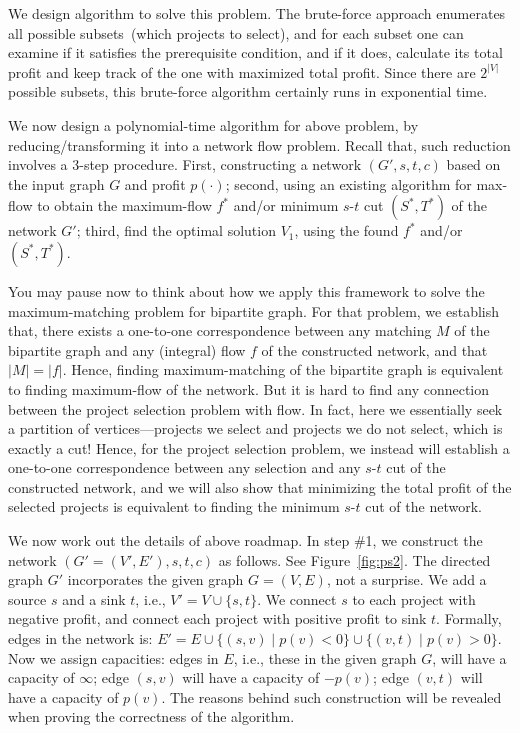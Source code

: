We design algorithm to solve this problem. The brute-force approach
enumerates all possible subsets~(which projects to select), and for each subset
one can examine if it satisfies the prerequisite condition, and if it does, calculate
its total profit and keep track of the one with maximized total profit. 
Since there are $2^{|V|}$ possible subsets, this brute-force algorithm certainly runs in exponential time.

We now design a polynomial-time algorithm for above problem, by
reducing/transforming it into a network flow problem.
Recall that, such reduction involves a 3-step procedure. First,
constructing a network $(G', s, t, c)$ based on the input graph $G$ and profit
$p(\cdot)$; second, using an existing algorithm for max-flow to obtain the
maximum-flow $f^*$ and/or minimum $s$-$t$ cut $(S^*, T^*)$ of the network $G'$;
third, find the optimal solution $V_1$, using the found $f^*$ and/or $(S^*, T^*)$.

You may pause now to think about how we apply this framework to solve the maximum-matching problem for bipartite graph.
For that problem, we establish that, there exists a one-to-one correspondence between any matching $M$ of the bipartite
graph and any (integral) flow $f$ of the constructed network, and that $|M| = |f|$. Hence, finding maximum-matching of the
bipartite graph is equivalent to finding maximum-flow of the network. 
But it is hard to find any connection between the project selection problem with flow. In fact, here we essentially seek
a partition of vertices---projects we select and projects we do not select, which is exactly a cut!
Hence, for the project selection problem, we instead will establish a
one-to-one correspondence between any selection and any $s$-$t$ cut
of the constructed network, and we will also show that minimizing the
total profit of the selected projects
is equivalent to finding the minimum $s$-$t$ cut of the network.

We now work out the details of above roadmap. In step \#1, we construct the network $(G' = (V',E'),s,t,c)$ as follows.
See Figure~\ref{fig:ps2}. The directed graph $G'$ incorporates the given graph $G = (V, E)$, not a surprise.
We add a source $s$ and a sink $t$, i.e., $V' = V\cup \{s,t\}$. We connect $s$ to each project with negative profit, and
connect each project with positive profit to sink $t$. Formally, edges in the network is: 
$E' = E\cup \{(s,v)\mid p(v) < 0\} \cup \{(v,t)\mid p(v) > 0\}$.
Now we assign capacities: edges in $E$, i.e., these in the given graph $G$, will have a capacity of $\infty$;
edge $(s,v)$ will have a capacity of $-p(v)$;
edge $(v,t)$ will have a capacity of $p(v)$.
The reasons behind such construction will be revealed when proving the correctness of the algorithm.

